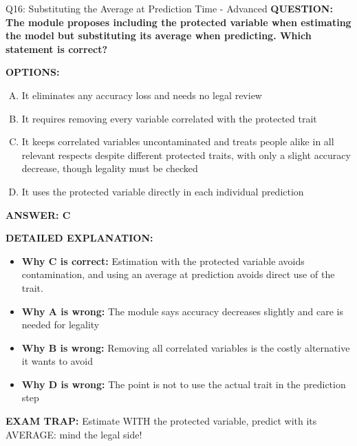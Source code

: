 \documentclass[8pt]{beamer}
\begin{document}
\begin{frame}[shrink=6]{Q16: Substituting the Average at Prediction Time - Advanced}
\fontsize{6.5}{7.5}\selectfont
\textbf{QUESTION: The module proposes including the protected variable when estimating the model but substituting its average when predicting. Which statement is correct?}

\vspace{0.1cm}
\textbf{OPTIONS:}
\begin{enumerate}[A.]
\item It eliminates any accuracy loss and needs no legal review
\item It requires removing every variable correlated with the protected trait
\item It keeps correlated variables uncontaminated and treats people alike in all relevant respects despite different protected traits, with only a slight accuracy decrease, though legality must be checked
\item It uses the protected variable directly in each individual prediction
\end{enumerate}

\vspace{0.1cm}
\textcolor{myblue}{\textbf{ANSWER: C}}

\vspace{0.1cm}
\textbf{DETAILED EXPLANATION:}
\begin{itemize}
\item \textbf{Why C is correct:} Estimation with the protected variable avoids contamination, and using an average at prediction avoids direct use of the trait.
\item \textbf{Why A is wrong:} The module says accuracy decreases slightly and care is needed for legality
\item \textbf{Why B is wrong:} Removing all correlated variables is the costly alternative it wants to avoid
\item \textbf{Why D is wrong:} The point is not to use the actual trait in the prediction step
\end{itemize}

\textcolor{myred}{\textbf{EXAM TRAP:}} Estimate WITH the protected variable, predict with its AVERAGE: mind the legal side!
\end{frame}
\end{document}
